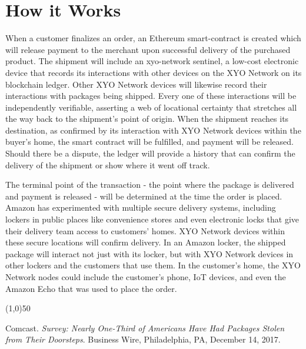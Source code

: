 \documentclass{article}
\begin{document}
\section {How it Works}
When a customer finalizes an order, an Ethereum \gls{smart-contract} is created which will release payment to the merchant upon successful delivery of the purchased product. The shipment will include an \Gls{xyo-network} \Gls{sentinel}, a low-cost electronic device that records its interactions with other devices on the XYO Network on its blockchain ledger. Other XYO Network devices will likewise record their interactions with packages being shipped. Every one of these interactions will be independently verifiable, asserting a web of locational certainty that stretches all the way back to the shipment's point of origin. When the shipment reaches its destination, as confirmed by its interaction with XYO Network devices within the buyer's home, the smart contract will be fulfilled, and payment will be released. Should there be a dispute, the ledger will provide a history that can confirm the delivery of the shipment or show where it went off track.

The terminal point of the transaction - the point where the package is delivered and payment is released - will be determined at the time the order is placed. Amazon has experimented with multiple secure delivery systems, including lockers in public places like convenience stores and even electronic locks that give their delivery team access to customers' homes. XYO Network devices within these secure locations will confirm delivery. In an Amazon locker, the shipped package will interact not just with its locker, but with XYO Network devices in other lockers and the customers that use them. In the customer's home, the XYO Network nodes could include the customer's phone, IoT devices, and even the Amazon Echo that was used to place the order.


\begin{center}
\line(1,0){50}
\end{center}


\clearpage

\begin{thebibliography}{9}

Comcast.
\textit{Survey: Nearly One-Third of Americans Have Had Packages Stolen from Their Doorsteps}.
Business Wire, Philadelphia, PA, December 14, 2017.


\end{thebibliography}
 
\printglossaries
\end{document}
